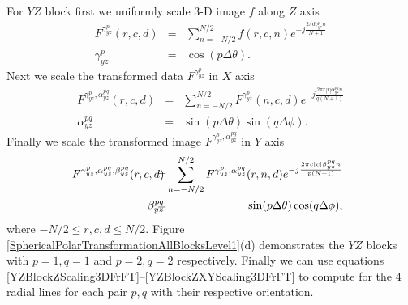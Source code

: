 \documentclass{UCF_ETD}
\begin{document}
 For $YZ$ block first we uniformly scale 3-D image $f$ along $Z$ axis
 \begin{eqnarray} \label{YZBlockZScaling3DFrFT}
 F^{\gamma^{p}_{yz}} (r,c,d) &=& \sum\limits_{n=-N/2}^{N/2} f(r,c,n) e^{-j\frac{2\pi d\gamma^{p}_{yz} n}{N+1}} \nonumber \\
 \gamma^{p}_{yz} &=& \cos (p\Delta \theta). %
 \end{eqnarray}
 Next we scale the transformed data $F^{\gamma^{p}_{yz}}$ in $X$ axis
 \begin{eqnarray} \label{YZBlockZXScaling3DFrFT}
 F^{\gamma^{p}_{yz}, \alpha^{pq}_{yz} } (r,c,d) &=& \sum\limits_{n=-N/2}^{N/2} F^{\gamma^{p}_{yz}} (n,c,d) e^{-j\frac{2\pi r |r| \alpha^{pq}_{yz} n}{q(N+1)}} \nonumber \\
 \alpha^{pq}_{yz} &=& \sin (p\Delta \theta) \sin (q\Delta \phi).  %
 \end{eqnarray}
 Finally we scale the transformed image $F^{\gamma^{p}_{yz}, \alpha^{pq}_{yz} }$ in $Y$ axis
 \begin{eqnarray} \label{YZBlockZXYScaling3DFrFT}
 \hskip-0.08in  F^{\gamma^{p}_{yz}, \alpha^{pq}_{yz}, \beta^{pq}_{yz} } (r,c,d) & \hskip-0.12in =  & \hskip-0.12in \sum\limits_{n=-N/2}^{N/2}  F^{\gamma^{p}_{yz}, \alpha^{pq}_{yz}} (r,n,d) e^{-j\frac{2\pi c |c| \beta^{pq}_{yz} n}{p(N+1)}} \nonumber \\
 \hskip-0.08in  \beta^{pq}_{yz} & \hskip-0.12in =  & \hskip-0.08in \sin (p\Delta \theta) \cos (q\Delta \phi), %
 \end{eqnarray}
 where $-N/2 \leq r,c,d \leq N/2$. Figure \ref{SphericalPolarTransformationAllBlocksLevel1}(d) demonstrates the $YZ$ blocks with $p = 1,q = 1$ and  $p = 2,q = 2$ respectively. Finally we can use  equations \eqref{YZBlockZScaling3DFrFT}--\eqref{YZBlockZXYScaling3DFrFT} to compute for the $4$ radial lines for each pair $p,q$ with their respective orientation.
 
\end{document}
